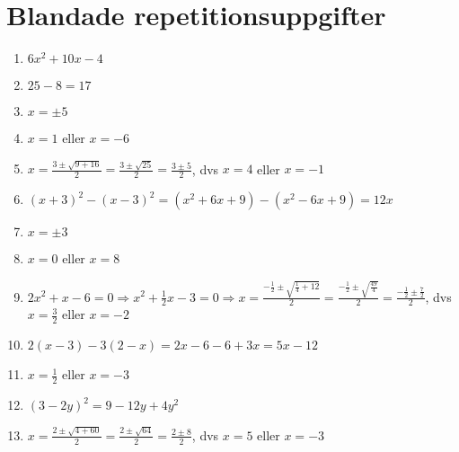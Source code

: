 \documentclass[a4paper,11pt]{article}
\begin{document}
\section{Blandade repetitionsuppgifter}
\begin{enumerate}[label=\textbf{\arabic*.}]
    \item $6x^2 + 10x - 4$
    \item $25 - 8 = 17$
    \item $x = \pm 5$
    \item $x = 1$ eller $x = -6$
    \item $x = \frac{3 \pm \sqrt{9+16}}{2} = \frac{3 \pm \sqrt{25}}{2} = \frac{3 \pm 5}{2}$, dvs $x = 4$ eller $x = -1$
    \item $(x+3)^2 - (x-3)^2 = (x^2 + 6x + 9) - (x^2 - 6x + 9) = 12x$
    \item $x = \pm 3$
    \item $x = 0$ eller $x = 8$
    \item $2x^2 + x - 6 = 0 \Rightarrow x^2 + \frac{1}{2}x - 3 = 0 \Rightarrow x = \frac{-\frac{1}{2} \pm \sqrt{\frac{1}{4}+12}}{2} = \frac{-\frac{1}{2} \pm \sqrt{\frac{49}{4}}}{2} = \frac{-\frac{1}{2} \pm \frac{7}{2}}{2}$, dvs $x = \frac{3}{2}$ eller $x = -2$
    \item $2(x - 3) - 3(2 - x) = 2x - 6 - 6 + 3x = 5x - 12$
    \item $x = \frac{1}{2}$ eller $x = -3$
    \item $(3 - 2y)^2 = 9 - 12y + 4y^2$
    \item $x = \frac{2 \pm \sqrt{4+60}}{2} = \frac{2 \pm \sqrt{64}}{2} = \frac{2 \pm 8}{2}$, dvs $x = 5$ eller $x = -3$
\end{enumerate}
\end{document}
